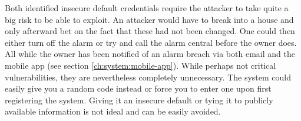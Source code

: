 Both identified insecure default credentials require the attacker to take quite a big risk to be able to exploit. An attacker would have to break into a house and only afterward bet on the fact that these had not been changed. One could then either turn off the alarm or try and call the alarm central before the owner does. All while the owner has been notified of an alarm breach via both email and the mobile app (see section \ref{ch:system:mobile-app}). While perhaps not critical vulnerabilities, they are nevertheless completely unnecessary. The system could easily give you a random code instead or force you to enter one upon first registering the system. Giving it an insecure default or tying it to publicly available information is not ideal and can be easily avoided.
